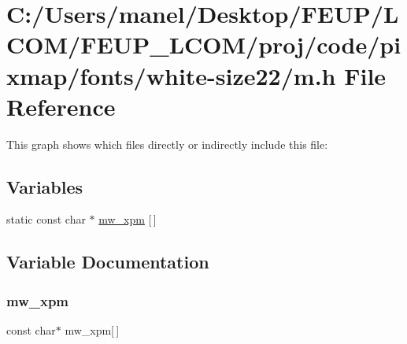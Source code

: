 \hypertarget{white-size22_2m_8h}{}\section{C\+:/\+Users/manel/\+Desktop/\+F\+E\+U\+P/\+L\+C\+O\+M/\+F\+E\+U\+P\+\_\+\+L\+C\+O\+M/proj/code/pixmap/fonts/white-\/size22/m.h File Reference}
\label{white-size22_2m_8h}
This graph shows which files directly or indirectly include this file\+:
\subsection*{Variables}
\begin{DoxyCompactItemize}
\item 
static const char $\ast$ \mbox{\hyperlink{white-size22_2m_8h_a2abf85e1536b772fb8553e7b18787aad}{mw\+\_\+xpm}} \mbox{[}$\,$\mbox{]}
\end{DoxyCompactItemize}


\subsection{Variable Documentation}
\mbox{\label{white-size22_2m_8h_a2abf85e1536b772fb8553e7b18787aad}} 
\subsubsection{\texorpdfstring{mw\_xpm}{mw\_xpm}}
{\footnotesize\ttfamily const char$\ast$ mw\+\_\+xpm\mbox{[}$\,$\mbox{]}\hspace{0.3cm}{\ttfamily [static]}}

